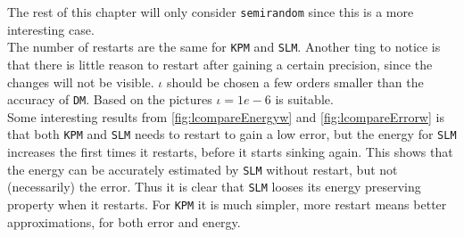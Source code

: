 The rest of this chapter will only consider \texttt{semirandom} since this is a more interesting case. \\

\noindent The number of restarts are the same for \texttt{KPM} and \texttt{SLM}. Another ting to notice is that there is little reason to restart after gaining a certain precision, since the changes will not be visible. $\iota$ should be chosen a few orders smaller than the accuracy of \texttt{DM}. Based on the pictures $\iota = 1e-6$ is suitable. \\

\noindent Some interesting results from \ref{fig:lcompareEnergyw} and \ref{fig:lcompareErrorw} is that both \texttt{KPM} and \texttt{SLM} needs to restart to gain a low error, but the energy for \texttt{SLM} increases the first times it restarts, before it starts sinking again. This shows that the energy can be accurately estimated by \texttt{SLM} without restart, but not (necessarily) the error.  Thus it is clear that \texttt{SLM} looses its energy preserving property when it restarts. For \texttt{KPM} it is much simpler, more restart means better approximations, for both error and energy.\\

